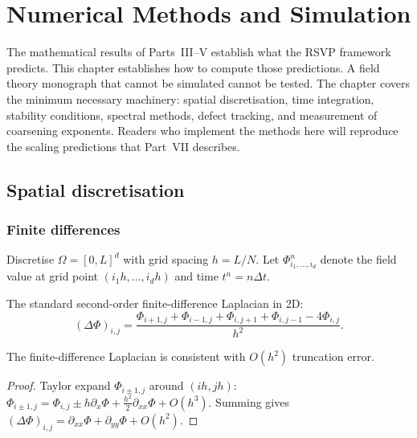 
\chapter{Numerical Methods and Simulation}
\label{ch:numerical-methods}

\begin{WhyChapter}
  The mathematical results of Parts~III--V establish what the
  RSVP framework predicts.
  This chapter establishes how to compute those predictions.
  A field theory monograph that cannot be simulated cannot be
  tested.
  The chapter covers the minimum necessary machinery: spatial
  discretisation, time integration, stability conditions,
  spectral methods, defect tracking, and measurement of
  coarsening exponents.
  Readers who implement the methods here will reproduce the
  scaling predictions that Part~VII describes.
\end{WhyChapter}

\section{Spatial discretisation}

\subsection*{Finite differences}

Discretise $\Omega = [0,L]^d$ with grid spacing $h = L/N$.
Let $\Phi_{i_1,\ldots,i_d}^n$ denote the field value at
grid point $(i_1 h,\ldots,i_d h)$ and time $t^n = n\Delta t$.

The standard second-order finite-difference Laplacian in 2D:
\[
  (\Delta\Phi)_{i,j}
  = \frac{\Phi_{i+1,j} + \Phi_{i-1,j} + \Phi_{i,j+1}
    + \Phi_{i,j-1} - 4\Phi_{i,j}}{h^2}.
\]

\begin{proposition}
  \label{prop:fd-consistency}
  \statusproven{}
  The finite-difference Laplacian is consistent with
  $O(h^2)$ truncation error.
\end{proposition}

\begin{proof}
  Taylor expand $\Phi_{i\pm 1,j}$ around $(ih,jh)$:
  $\Phi_{i\pm 1,j} = \Phi_{i,j} \pm h\partial_x\Phi
  + \frac{h^2}{2}\partial_{xx}\Phi + O(h^3)$.
  Summing gives $(\Delta\Phi)_{i,j} = \partial_{xx}\Phi
  + \partial_{yy}\Phi + O(h^2)$.
\end{proof}

